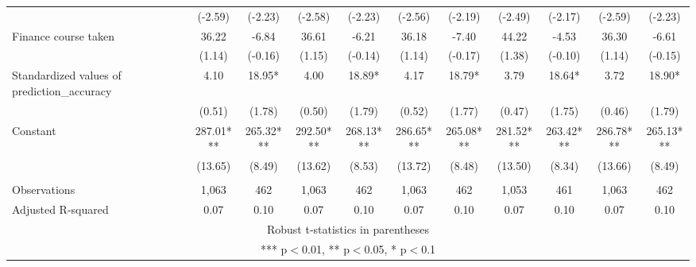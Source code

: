 \documentclass[]{article}
\begin{document}
\begin{tabular}{lcccccccccc}
 & (-2.59) & (-2.23) & (-2.58) & (-2.23) & (-2.56) & (-2.19) & (-2.49) & (-2.17) & (-2.59) & (-2.23) \\
Finance course taken & 36.22 & -6.84 & 36.61 & -6.21 & 36.18 & -7.40 & 44.22 & -4.53 & 36.30 & -6.61 \\
 & (1.14) & (-0.16) & (1.15) & (-0.14) & (1.14) & (-0.17) & (1.38) & (-0.10) & (1.14) & (-0.15) \\
Standardized values of prediction\_accuracy & 4.10 & 18.95* & 4.00 & 18.89* & 4.17 & 18.79* & 3.79 & 18.64* & 3.72 & 18.90* \\
 & (0.51) & (1.78) & (0.50) & (1.79) & (0.52) & (1.77) & (0.47) & (1.75) & (0.46) & (1.79) \\
Constant & 287.01*** & 265.32*** & 292.50*** & 268.13*** & 286.65*** & 265.08*** & 281.52*** & 263.42*** & 286.78*** & 265.13*** \\
 & (13.65) & (8.49) & (13.62) & (8.53) & (13.72) & (8.48) & (13.50) & (8.34) & (13.66) & (8.49) \\
 &  &  &  &  &  &  &  &  &  &  \\
Observations & 1,063 & 462 & 1,063 & 462 & 1,063 & 462 & 1,053 & 461 & 1,063 & 462 \\
 Adjusted R-squared & 0.07 & 0.10 & 0.07 & 0.10 & 0.07 & 0.10 & 0.07 & 0.10 & 0.07 & 0.10 \\ \hline
\multicolumn{11}{c}{ Robust t-statistics in parentheses} \\
\multicolumn{11}{c}{ *** p$<$0.01, ** p$<$0.05, * p$<$0.1} \\
\end{tabular}
\end{document}
